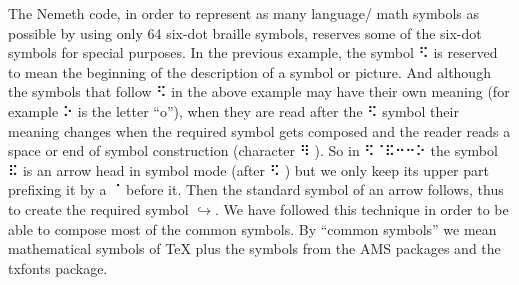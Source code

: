 \documentclass[11.5pt]{sig-alternate} %
\begin{document}
\begin{large}
The Nemeth code, in order to represent as many language/ math symbols as possible by using only 64 six-dot braille symbols, reserves some of the six-dot symbols for special purposes. In the previous example, the symbol  ⠫  is reserved to mean the beginning of the description of a symbol or picture. And although the symbols that follow  ⠫  in the above example may have their own meaning (for example  ⠕  is the letter “o”), when they are read after the  ⠫  symbol their meaning changes when the required symbol gets composed and the reader reads a space or end of symbol construction (character  ⠻ ). So in  ⠫⠈⠯⠒⠒⠕  the symbol  ⠯  is an arrow head in symbol mode (after  ⠫ ) but we only keep its upper part prefixing it by a  ⠈  before it. Then the standard symbol of an arrow follows, thus to create the required symbol $\hookrightarrow$. We have followed this technique in order to be able to compose most of the common symbols. By “common symbols” we mean mathematical symbols of TeX plus the symbols from the AMS packages and the txfonts package.


\end{large}
\end{document}
